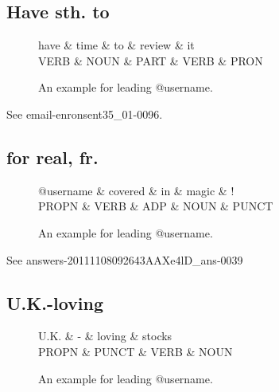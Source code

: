 \documentclass[11pt,a4paper]{article}
\begin{document}
\subsection{Have sth. to}
\begin{figure}[t]
	\centering
	\small
	\begin{dependency}[edge slant=2, text only label, label style=above]
		\begin{deptext}
			have \& time \& to \& review \& it \\
			VERB \& NOUN \& PART \& VERB \& PRON \\
		\end{deptext}
	\end{dependency}
	\caption{An example for leading @username.}\label{fig:case-04}
\end{figure}
See email-enronsent35\_01-0096.


\subsection{for real, fr.}
\begin{figure}[t]
	\centering
	\small
	\begin{dependency}[edge slant=2, text only label, label style=above]
		\begin{deptext}
			@username \& covered \& in \& magic \& ! \\
			PROPN \& VERB \& ADP \& NOUN \& PUNCT \\
		\end{deptext}
	\end{dependency}
	\caption{An example for leading @username.}\label{fig:case-06}
\end{figure}
See answers-20111108092643AAXe4lD\_ans-0039

\subsection{U.K.-loving}
\begin{figure}[t]
	\centering
	\small
	\begin{dependency}[edge slant=2, text only label, label style=above]
		\begin{deptext}
			U.K. \& - \& loving \& stocks \\
			PROPN \& PUNCT \& VERB \& NOUN \\
		\end{deptext}
	\end{dependency}
	\caption{An example for leading @username.}\label{fig:case-08}
\end{figure}
\end{document}
